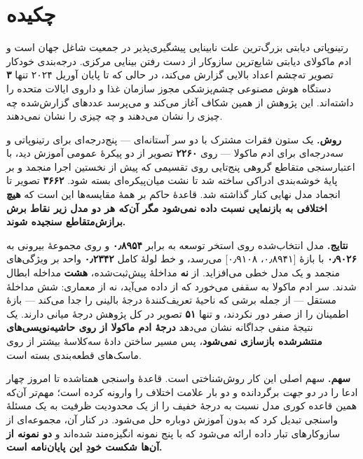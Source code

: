 
\chapter*{چکیده}

رتینوپاتی دیابتی بزرگ‌ترین علت نابینایی پیشگیری‌پذیر در جمعیت شاغل جهان است و ادم ماکولای
دیابتی شایع‌ترین سازوکار از دست رفتن بینایی مرکزی. درجه‌بندی خودکار تصویر ته‌چشم اعداد بالایی
گزارش می‌کند، در حالی که تا پایان آوریل \num{۲۰۲۴} تنها \textbf{\num{۳}} دستگاه هوش مصنوعی چشم‌پزشکی مجوز
سازمان غذا و داروی ایالات متحده را داشته‌اند. این پژوهش از همین شکاف آغاز می‌کند و می‌پرسد
عددهای گزارش‌شده چه چیزی را نشان می‌دهند و چه چیزی را نشان نمی‌دهند.

\textbf{روش.} یک ستون فقرات مشترک با دو سر آستانه‌ای — پنج‌درجه‌ای برای رتینوپاتی و
سه‌درجه‌ای برای ادم ماکولا — روی \textbf{\num{۲۲۶۰}} تصویر از دو پیکرهٔ عمومی آموزش دید، با
اعتبارسنجی متقاطع گروهی پنج‌تایی روی تقسیمی که پیش از نخستین اجرا منجمد و بر پایهٔ خوشه‌بندی
ادراکی ساخته شد تا نشت میان‌پیکره‌ای بسته شود. \textbf{\num{۳۶۶۲}} تصویر  تا انجماد مدل
نهایی کنار گذاشته شد. قاعدهٔ حاکم بر همهٔ مقایسه‌ها این است که \textbf{هیچ اختلافی به بازنمایی
نسبت داده نمی‌شود مگر آن‌که هر دو مدل زیر نقاط برش برازش‌متقاطع سنجیده شوند.}

\textbf{نتایج.} مدل انتخاب‌شده روی استخر توسعه به  برابر \textbf{\num{۰٫۸۹۵۴}} و روی
مجموعهٔ بیرونی به \textbf{\num{۰٫۹۰۲۶}} با بازهٔ [\num{۰٫۸۹۴۱}، \num{۰٫۹۱۰۸}] می‌رسد، و خط لولهٔ کامل
\textbf{\num{۰٫۲۳۴۲}} واحد بر ویژگی‌های منجمد و یک مدل خطی می‌افزاید. از \textbf{نه} مداخلهٔ
پیش‌ثبت‌شده، \textbf{هشت} مداخله ابطال شدند. سر ادم ماکولا به سقفی می‌خورد که از داده می‌آید،
نه از معماری: شش مداخلهٔ مستقل — از جمله برشی که ناحیهٔ تعریف‌کنندهٔ درجهٔ بالینی را جدا
می‌کند — بازهٔ اطمینان را از صفر دور نکردند، و تنها \textbf{\num{۵۱}} تصویر در کل پژوهش درجهٔ
میانی دارند. یک نتیجهٔ منفی جداگانه نشان می‌دهد \textbf{درجهٔ ادم ماکولا از روی
حاشیه‌نویسی‌های منتشرشده بازسازی نمی‌شود}، پس مسیر ساختن دادهٔ سه‌کلاسهٔ بیشتر از روی
ماسک‌های قطعه‌بندی بسته است.

\textbf{سهم.} سهم اصلی این کار روش‌شناختی است. قاعدهٔ واسنجی همتاشده تا امروز چهار ادعا را در
\emph{دو جهت} برگردانده و دو بار علامت اختلاف را وارونه کرده است؛ مهم‌تر آن‌که همین قاعده کوری
مدل نسبت به درجهٔ خفیف را از یک محدودیت ظرفیت به یک مسئلهٔ واسنجی تبدیل کرد که بدون آموزش
دوباره حل می‌شود. در کنار آن، مجموعه‌ای از سازوکارهای تبار داده ارائه می‌شود که با پنج نمونه
انگیزه‌مند شده‌اند و \textbf{دو نمونه از آن‌ها شکست خودِ این پایان‌نامه است.}

